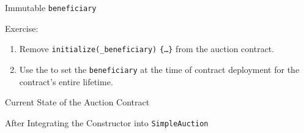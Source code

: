 \documentclass[]{beamer}
\begin{document}
\begin{frame}{Immutable \texttt{beneficiary}}

	\begin{exercise}{Exercise:}
		\begin{enumerate}
			\item Remove  \texttt{initialize(}\texttt{\_beneficiary)}  \texttt{\{\dots\}} from the auction contract.
			\item Use the  to set the \texttt{beneficiary} at the time of contract deployment for the contract's entire lifetime.
		\end{enumerate}
	\end{exercise}
		
	
\end{frame}

\begin{frame}{Current State of the Auction Contract}
	\begin{samplecode}{After Integrating the Constructor into \texttt{SimpleAuction}}
		
	\end{samplecode}
\end{frame}
\end{document}
